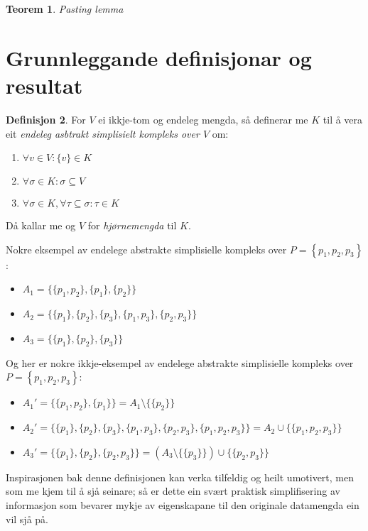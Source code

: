 \documentclass[a4paper, titlepage, 12pt, norsk]{article}
\theoremstyle{plain}
\newtheorem{theorem}{Teorem}[section]
\theoremstyle{definition}
\newtheorem{definition}[theorem]{Definisjon}
\newcommand{\union}{ \mathop{\cup}\limits }
\newcommand{\set}[1]{ \left \{ #1 \right \} } %
\begin{document}
\begin{theorem}
	Pasting lemma
\end{theorem}

\section{Grunnleggande definisjonar og resultat}

\begin{definition} \label{def:ASK}
	For $V$ ei ikkje-tom og endeleg mengda, så definerar me $K$ til å vera eit \emph{endeleg asbtrakt simplisielt kompleks over $V$} om:
	\begin{enumerate}
		\item{$\forall v \in V: \{v\} \in K$}
		\item{\( \forall \sigma \in K: \sigma \subseteq V \)}
		\item{$\forall \sigma \in K, \forall \tau \subseteq \sigma: \tau \in K$}
	\end{enumerate}
	Då kallar me og $V$ for \emph{hjørnemengda} til $K$.
\end{definition}

Nokre eksempel av endelege abstrakte simplisielle kompleks over \( P=\set{p_1, p_2, p_3} \):

\begin{itemize}
	\item{$A_1=\{\{p_1, p_2\}, \{p_1\}, \{p_2\}\}$}
	\item{$A_2=\{\{p_1\}, \{p_2\}, \{p_3\}, \{p_1, p_3\}, \{p_2, p_3\}\}$}
	\item{$A_3=\{\{p_1\}, \{p_2\}, \{p_3\}\}$}
\end{itemize}

Og her er nokre ikkje-eksempel av endelege abstrakte simplisielle kompleks over \( P=\set{p_1, p_2, p_3} \):

\begin{itemize}
	\item{$A_1'=\{\{p_1, p_2\}, \{p_1\}\}=A_1 \setminus \{\{p_2\}\}$}
	\item{$A_2'=\{\{p_1\}, \{p_2\}, \{p_3\}, \{p_1, p_3\}, \{p_2, p_3\}, \{p_1, p_2, p_3\}\}=A_2 \union \{\{p_1, p_2, p_3\}\}$}
	\item{$A_3'=\{\{p_1\}, \{p_2\}, \{p_2, p_3\}\}=\left(A_3 \setminus \{\{p_3\}\}\right) \union \{\{p_2, p_3\}\}$}
\end{itemize}

Inspirasjonen bak denne definisjonen kan verka tilfeldig og heilt umotivert, men som me kjem til å sjå seinare; så er dette ein svært praktisk simplifisering av informasjon som bevarer mykje av eigenskapane til den originale datamengda ein vil sjå på.
\end{document}
